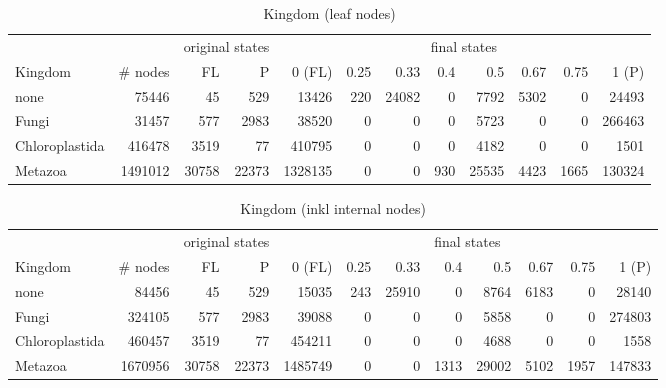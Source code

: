       \begin{table}
        \begin{center}
          \hspace*{-2cm}\begin{tabular}{ |l|r||r|r||r|r|r|r|r|r|r|r| }
            \hline
            & & \multicolumn{2}{c||}{original states} & \multicolumn{8}{c|}{final states} \\
            Kingdom & \# nodes & FL & P
              & 0 (FL) & 0.25 & 0.33 & 0.4 & 0.5 & 0.67 & 0.75 & 1 (P) \\
            \hline \hline
            none & 75446 & 45 & 529 
              & 13426 & 220 & 24082 & 0 & 7792 & 5302 & 0 & 24493 \\
            Fungi & 31457 & 577 & 2983
              & 38520 & 0 & 0 & 0 & 5723 & 0 & 0 & 266463 \\
            Chloroplastida & 416478 & 3519 & 77
              & 410795 & 0 & 0 & 0 & 4182 & 0 & 0 & 1501 \\
            Metazoa & 1491012 & 30758 & 22373
              & 1328135 & 0 & 0 & 930 & 25535 & 4423 & 1665 & 130324 \\
            \hline  
          \end{tabular}
        \end{center}
        \caption{Kingdom (leaf nodes)}
        \label{table:Kingdom leaf nodes}
      \end{table}

      \begin{table}
        \begin{center}
          \hspace*{-2cm}\begin{tabular}{ |l|r||r|r||r|r|r|r|r|r|r|r| }
            \hline
            & & \multicolumn{2}{c||}{original states} & \multicolumn{8}{c|}{final states} \\
            Kingdom & \# nodes & FL & P
              & 0 (FL) & 0.25 & 0.33 & 0.4 & 0.5 & 0.67 & 0.75 & 1 (P) \\
            \hline \hline
            none & 84456 & 45 & 529 
              & 15035 & 243 & 25910 & 0 & 8764 & 6183 & 0 & 28140 \\
            Fungi & 324105 & 577 & 2983
              & 39088 & 0 & 0 & 0 & 5858 & 0 & 0 & 274803 \\
            Chloroplastida & 460457 & 3519 & 77
              & 454211 & 0 & 0 & 0 & 4688 & 0 & 0 & 1558 \\
            Metazoa & 1670956 & 30758 & 22373
              & 1485749 & 0 & 0 & 1313 & 29002 & 5102 & 1957 & 147833 \\
            \hline  
          \end{tabular}
        \end{center}
        \caption{Kingdom (inkl internal nodes)}
        \label{table:Kingdom internal nodes}
      \end{table}


